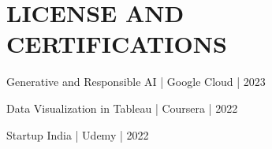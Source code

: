 \documentclass[a4paper,11pt]{article}
\makeatletter
\newcommand{\resumeItem}[1]{
  \item\small{
    {#1 \vspace{-2pt}}
  }
}
\newcommand{\resumeSubheading}[4]{
  \vspace{-2pt}\item
    \begin{tabular*}{1.0\textwidth}[t]{l@{\extracolsep{\fill}}r}
      \textbf{#1} & \textbf{\small #2} \\
      \textit{\small#3} & \textit{\small #4} \\
    \end{tabular*}\vspace{-7pt}
}
\newcommand{\resumeSubItem}[1]{\resumeItem{#1}\vspace{-4pt}}
\newcommand{\resumeSubHeadingListStart}{\begin{itemize}[leftmargin=0.0in, label={}]}
\newcommand{\resumeSubHeadingListEnd}{\end{itemize}}
\makeatother
\begin{document}
\vspace{-3pt}
\section{LICENSE AND CERTIFICATIONS}
\begin{description}[font=$\bullet$]
\item {Generative and Responsible AI | Google Cloud | 2023 }
\vspace{-5pt}
\item {Data Visualization in Tableau | Coursera | 2022}
\vspace{-5pt}
\item {Startup India | Udemy | 2022}
\vspace{-5pt}
\vspace{-5pt}

\end{description}

\vspace{-5pt}

    

\end{document}

